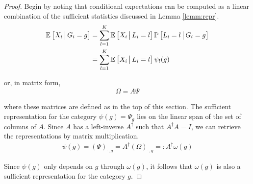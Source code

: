\documentclass{article}
\theoremstyle{plain}
\theoremstyle{definition}
\theoremstyle{remark}
\begin{document}
\begin{proof} \label{proof:means}
Begin by noting that conditioanl expectations can be computed as a linear combination of the sufficient statistics discussed in Lemma \ref{lemm:repr}.
\begin{align}
    \mathbb{E}_{}\left[ X_{i} \,\big|\, G_{i} = g\right]
    &= \sum_{l=1}^{K} \mathbb{E}_{}\left[X_{i} \,\big|\, L_{i} = l\right] \mathbb{P}_{}\left[L_{i} = l \,\big|\, G_{i} = g\right] \\
    &= \sum_{l=1}^{K} \mathbb{E}_{}\left[X_{i} \,\big|\, L_{i} = l\right] \psi_{l}(g)
    \label{eq:scalar_decomposition}
\end{align}

\noindent or, in matrix form,
\begin{align}
    \Omega = A\Psi
    \label{eq:matrix_decomposition}
\end{align}

where these matrices are defined as in the top of this section. The sufficient representation for the category $\psi(g) = \Psi_{g}$ lies on the linear span of the set of columns of $A$. Since $A$ has a left-inverse $A^\dagger$ such that $A^\dagger A = I$, we can retrieve the representations by matrix multiplication.
\begin{align}
    \psi(g) = (\Psi)_{\cdot, g} = A^\dagger(\Omega)_{\cdot, g} =: A^\dagger \omega(g)
    \label{eq:omega_inverse}
\end{align}

Since $\psi(g)$ only depends on $g$ through $\omega(g)$, it follows that $\omega(g)$ is also a sufficient representation for the category $g$.
\end{proof}
\end{document}
